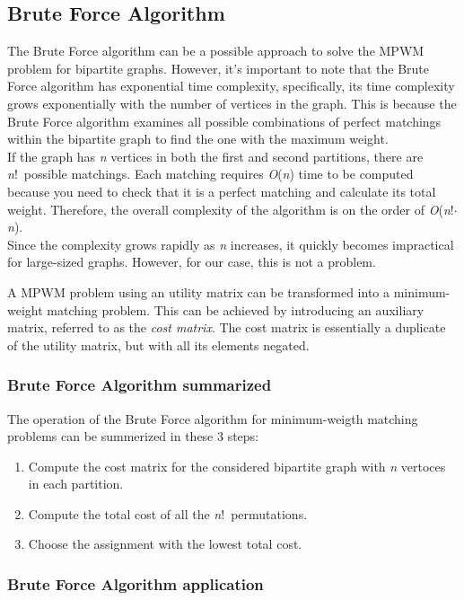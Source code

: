 \subsection{Brute Force Algorithm}
The Brute Force algorithm can be a possible approach to solve the MPWM problem for bipartite graphs.
However, it's important to note that the Brute Force algorithm has exponential time complexity, specifically, its time complexity grows exponentially with the number of vertices in the graph.
This is because the Brute Force algorithm examines all possible combinations of perfect matchings within the bipartite graph to find the one with the maximum weight.\\
If the graph has \textit{n} vertices in both the first and second partitions, there are \textit{n}!\ possible matchings.
Each matching requires \textit{O}(\textit{n}) time to be computed because you need to check that it is a perfect matching and calculate its total weight.
Therefore, the overall complexity of the algorithm is on the order of \textit{O}(\textit{n}!$\cdot$\textit{n}). \\
Since the complexity grows rapidly as \textit{n} increases, it quickly becomes impractical for large-sized graphs. However, for our case, this is not a problem.

A MPWM problem using an utility matrix can be transformed into a minimum-weight matching problem.
This can be achieved by introducing an auxiliary matrix, referred to as the \textit{cost matrix}.
The cost matrix is essentially a duplicate of the utility matrix, but with all its elements negated.

\subsubsection{Brute Force Algorithm summarized}
The operation of the Brute Force algorithm for minimum-weigth matching problems can be summerized in these 3 steps:

\begin{enumerate}
    \item {Compute the cost matrix for the considered bipartite graph with \textit{n} vertoces in each partition.}
    \item {Compute the total cost of all the \textit{n}!\ permutations.}
    \item {Choose the assignment with the lowest total cost.}
\end{enumerate}


\subsubsection{Brute Force Algorithm application}


